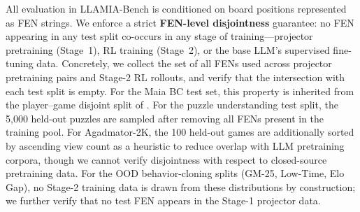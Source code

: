 All evaluation in LLAMIA-Bench is conditioned on board positions represented as FEN strings. We enforce a strict \textbf{FEN-level disjointness} guarantee: no FEN appearing in any test split co-occurs in any stage of training---projector pretraining (Stage~1), RL training (Stage~2), or the base LLM's supervised fine-tuning data. Concretely, we collect the set of all FENs used across projector pretraining pairs and Stage-2 RL rollouts, and verify that the intersection with each test split is empty. For the Maia BC test set, this property is inherited from the player--game disjoint split of \citet{mcilroy2020aligning}. For the puzzle understanding test split, the 5,000 held-out puzzles are sampled after removing all FENs present in the training pool. For Agadmator-2K, the 100 held-out games are additionally sorted by ascending view count as a heuristic to reduce overlap with LLM pretraining corpora, though we cannot verify disjointness with respect to closed-source pretraining data. For the OOD behavior-cloning splits (GM-25, Low-Time, Elo Gap), no Stage-2 training data is drawn from these distributions by construction; we further verify that no test FEN appears in the Stage-1 projector data.
